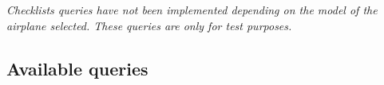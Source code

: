 \documentclass[12pt,oneside,a4]{article}
\begin{document}
\textit{
Checklists queries have not been implemented depending on the model of the airplane selected. 
These queries are only for test purposes.
}




\newpage
\begin{landscape}
\thispagestyle{empty}
\section*{Available queries}
\label{sec:available-queries}

\end{landscape}
\end{document}
